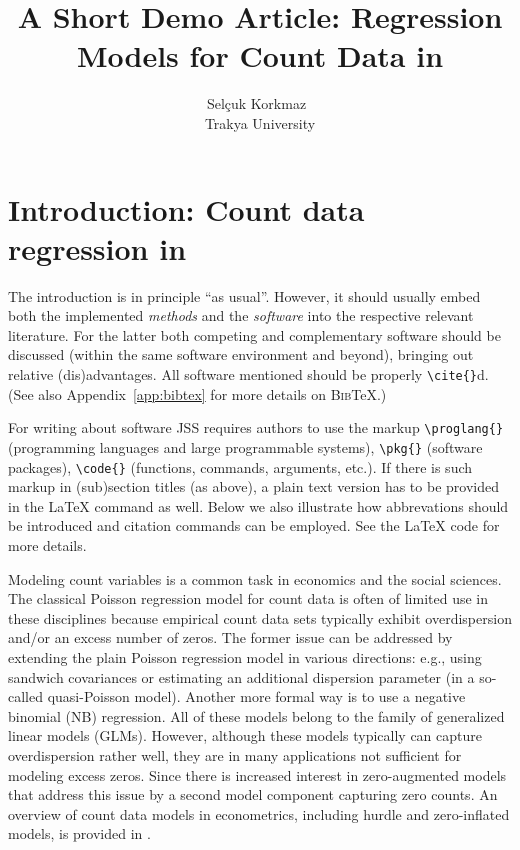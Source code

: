 \documentclass[article]{jss}
\author{Selçuk Korkmaz~\orcidlink{0000-0003-0918-3766}\\Trakya University}
\title{A Short Demo Article: Regression Models for Count Data in \proglang{R}}
\begin{document}


\section[Introduction: Count data regression in R]{Introduction: Count data regression in } \label{sec:intro}

\begin{leftbar}
The introduction is in principle ``as usual''. However, it should usually embed
both the implemented \emph{methods} and the \emph{software} into the respective
relevant literature. For the latter both competing and complementary software
should be discussed (within the same software environment and beyond), bringing
out relative (dis)advantages. All software mentioned should be properly
\verb|\cite{}|d. (See also Appendix~\ref{app:bibtex} for more details on
\textsc{Bib}{\TeX}.)

For writing about software JSS requires authors to use the markup
\verb|\proglang{}| (programming languages and large programmable systems),
\verb|\pkg{}| (software packages), \verb|\code{}| (functions, commands,
arguments, etc.). If there is such markup in (sub)section titles (as above), a
plain text version has to be provided in the {\LaTeX} command as well. Below we
also illustrate how abbrevations should be introduced and citation commands can
be employed. See the {\LaTeX} code for more details.
\end{leftbar}

Modeling count variables is a common task in economics and the social sciences.
The classical Poisson regression model for count data is often of limited use in
these disciplines because empirical count data sets typically exhibit
overdispersion and/or an excess number of zeros. The former issue can be
addressed by extending  the plain Poisson regression model in various
directions: e.g., using sandwich covariances or estimating an additional
dispersion parameter (in a so-called quasi-Poisson model). Another more formal
way is to use a negative binomial (NB) regression. All of these models belong to
the family of generalized linear models (GLMs). However, although these models
typically can capture overdispersion rather well, they are in many applications
not sufficient for  modeling excess zeros. Since \cite{Mullahy:1986} there is
increased interest in zero-augmented models that address this issue by a second
model component capturing zero counts. An overview of count data models in
econometrics, including  hurdle and zero-inflated models, is provided in
\cite{Cameron+Trivedi:2013}.
\end{document}

